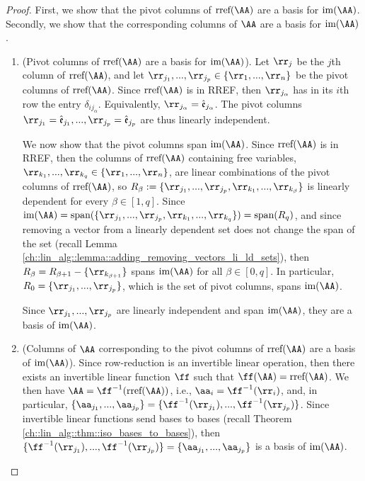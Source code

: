 \begin{proof}
    First, we show that the pivot columns of $\rref(\AA)$ are a basis for $\im(\AA)$. Secondly, we show that the corresponding columns of $\AA$ are a basis for $\im(\AA)$.

    \begin{enumerate}
        \item (Pivot columns of $\rref(\AA)$ are a basis for $\im(\AA)$). Let $\rr_j$ be the $j$th column of $\rref(\AA)$, and let $\rr_{j_1}, ..., \rr_{j_p} \in \{\rr_1, ..., \rr_n\}$ be the pivot columns of $\rref(\AA)$. Since $\rref(\AA)$ is in RREF, then $\rr_{j_\alpha}$ has in its $i$th row the entry $\delta_{ij_\alpha}$. Equivalently, $\rr_{j_\alpha} = \see_{j_\alpha}$. The pivot columns $\rr_{j_1} = \see_{j_1}, ..., \rr_{j_p} = \see_{j_p}$ are thus linearly independent. 

        We now show that the pivot columns span $\im(\AA)$. Since $\rref(\AA)$ is in RREF, then the columns of $\rref(\AA)$ containing free variables, $\rr_{k_1}, ..., \rr_{k_q} \in \{\rr_1, ..., \rr_n\}$, are linear combinations of the pivot columns of $\rref(\AA)$, so $R_\beta := \{\rr_{j_1}, ..., \rr_{j_p}, \rr_{k_1}, ..., \rr_{k_\beta}\}$ is linearly dependent for every $\beta \in [1, q]$. Since $\im(\AA) = \spann(\{\rr_{j_1}, ..., \rr_{j_p}, \rr_{k_1}, ..., \rr_{k_q}\}) = \spann(R_q)$, and since removing a vector from a linearly dependent set does not change the span of the set (recall Lemma \ref{ch::lin_alg::lemma::adding_removing_vectors_li_ld_sets}), then $R_\beta = R_{\beta + 1} - \{\rr_{k_{\beta + 1}}\}$ spans $\im(\AA)$ for all $\beta \in [0, q]$. In particular, $R_0 = \{\rr_{j_1}, ..., \rr_{j_p}\}$, which is the set of pivot columns, spans $\im(\AA)$. 
    
        Since $\rr_{j_1}, ..., \rr_{j_p}$ are linearly independent and span $\im(\AA)$, they are a basis of $\im(\AA)$.

        \item (Columns of $\AA$ corresponding to the pivot columns of $\rref(\AA)$ are a basis of $\im(\AA)$). Since row-reduction is an invertible linear operation, then there exists an invertible linear function $\ff$ such that $\ff(\AA) = \rref(\AA)$. We then have $\AA = \ff^{-1}(\rref(\AA))$, i.e., $\aa_i = \ff^{-1}(\rr_i)$, and, in particular, $\{\aa_{j_1}, ..., \aa_{j_p}\} = \{\ff^{-1}(\rr_{j_1}), ..., \ff^{-1}(\rr_{j_p})\}$. Since invertible linear functions send bases to bases (recall Theorem \ref{ch::lin_alg::thm::iso_bases_to_bases}), then $\{\ff^{-1}(\rr_{j_1}), ..., \ff^{-1}(\rr_{j_p})\} = \{\aa_{j_1}, ..., \aa_{j_p}\}$ is a basis of $\im(\AA)$.
    \end{enumerate}
\end{proof}

